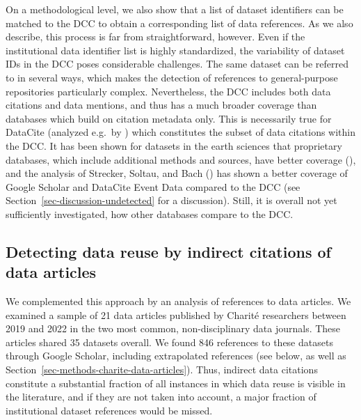 \documentclass[
  letterpaper,
  DIV=11,
  numbers=noendperiod]{scrartcl}
\begin{document}
On a methodological level, we also show that a list of dataset
identifiers can be matched to the DCC to obtain a corresponding list of
data references. As we also describe, this process is far from
straightforward, however. Even if the institutional data identifier list
is highly standardized, the variability of dataset IDs in the DCC poses
considerable challenges. The same dataset can be referred to in several
ways, which makes the detection of references to general-purpose
repositories particularly complex. Nevertheless, the DCC includes both
data citations and data mentions, and thus has a much broader coverage
than databases which build on citation metadata only. This is
necessarily true for DataCite (analyzed e.g.~by
) which constitutes the
subset of data citations within the DCC. It has been shown for datasets
in the earth sciences that proprietary databases, which include
additional methods and sources, have better coverage
(), and the analysis
of Strecker, Soltau, and Bach () has
shown a better coverage of Google Scholar and DataCite Event Data
compared to the DCC (see Section~\ref{sec-discussion-undetected} for a
discussion). Still, it is overall not yet sufficiently investigated, how
other databases compare to the DCC.

\subsection{Detecting data reuse by indirect citations of data
articles}\label{sec-discussion-data-articles}

We complemented this approach by an analysis of references to data
articles. We examined a sample of 21 data articles published by Charité
researchers between 2019 and 2022 in the two most common,
non-disciplinary data journals. These articles shared 35 datasets
overall. We found 846 references to these datasets through Google
Scholar, including extrapolated references (see below, as well as
Section~\ref{sec-methods-charite-data-articles}). Thus, indirect data
citations constitute a substantial fraction of all instances in which
data reuse is visible in the literature, and if they are not taken into
account, a major fraction of institutional dataset references would be
missed.
\end{document}
